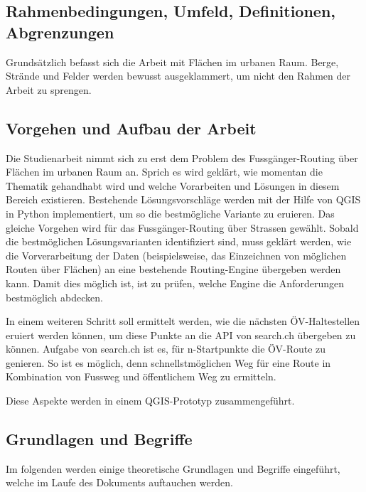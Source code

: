 \subsection{Rahmenbedingungen, Umfeld, Definitionen, Abgrenzungen}
\label{Rahmenbedingungen, Umfeld, Definitionen, Abgrenzungen}
Grundsätzlich befasst sich die Arbeit mit Flächen im urbanen Raum. Berge, Strände und Felder werden bewusst ausgeklammert, um nicht den Rahmen der Arbeit zu sprengen.


\subsection{Vorgehen und Aufbau der Arbeit}
\label{Vorgehen und Aufbau der Arbeit}
Die Studienarbeit nimmt sich zu erst dem Problem des Fussgänger-Routing über Flächen im urbanen Raum an. Sprich es wird geklärt, wie momentan die Thematik gehandhabt wird und welche Vorarbeiten und Lösungen in diesem Bereich existieren. Bestehende Lösungsvorschläge werden mit der Hilfe von QGIS in Python implementiert, um so die bestmögliche Variante zu eruieren. Das gleiche Vorgehen wird für das Fussgänger-Routing über Strassen gewählt. Sobald die bestmöglichen Lösungsvarianten identifiziert sind, muss geklärt werden, wie die Vorverarbeitung der Daten (beispielsweise, das Einzeichnen von möglichen Routen über Flächen) an eine bestehende Routing-Engine übergeben werden kann. Damit dies möglich ist, ist zu prüfen, welche Engine die Anforderungen bestmöglich abdecken.

In einem weiteren Schritt soll ermittelt werden, wie die nächsten ÖV-Haltestellen eruiert werden können, um diese Punkte an die API von search.ch übergeben zu können. Aufgabe von search.ch ist es, für n-Startpunkte die ÖV-Route zu genieren. So ist es möglich, denn schnellstmöglichen Weg für eine Route in Kombination von Fussweg und öffentlichem Weg zu ermitteln.

Diese Aspekte werden in einem QGIS-Prototyp zusammengeführt.


\subsection{Grundlagen und Begriffe}
\label{Grundlagen und Begriffe}

Im folgenden werden einige theoretische Grundlagen und Begriffe eingeführt, welche im Laufe des Dokuments auftauchen werden.

